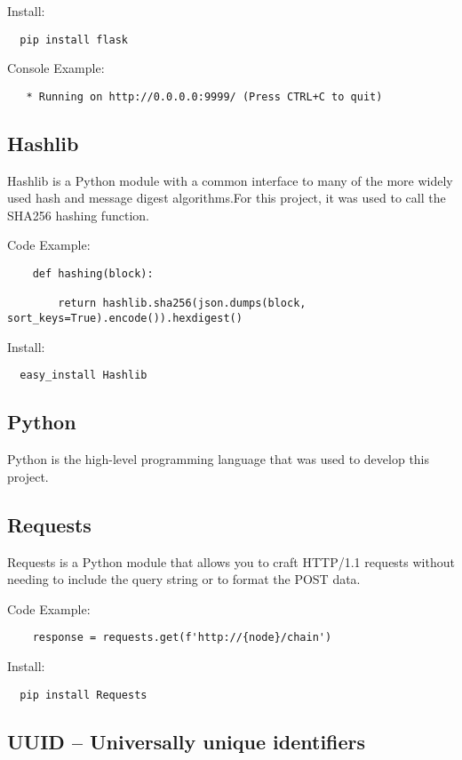 Install:
\begin{verbatim}
  pip install flask
\end{verbatim}

Console Example:
\begin{verbatim}
   * Running on http://0.0.0.0:9999/ (Press CTRL+C to quit)
\end{verbatim}

\subsection{Hashlib}

Hashlib is a Python module with a common interface to many of the more widely used hash and message digest algorithms.For this project, it was used to call the SHA256 hashing function.

Code Example:
\begin{verbatim}
	def hashing(block):

   		return hashlib.sha256(json.dumps(block, sort_keys=True).encode()).hexdigest()
\end{verbatim} 

Install:
\begin{verbatim}
  easy_install Hashlib
\end{verbatim}


\subsection{Python}

Python is the high-level programming language that was used to develop this project.

\subsection{Requests}

Requests is a Python module that allows you to craft HTTP/1.1 requests without needing to 
include the query string or to format the POST data.

Code Example:
\begin{verbatim}
	response = requests.get(f'http://{node}/chain')
\end{verbatim} 

Install:
\begin{verbatim}
  pip install Requests
\end{verbatim}


\subsection{UUID – Universally unique identifiers}

